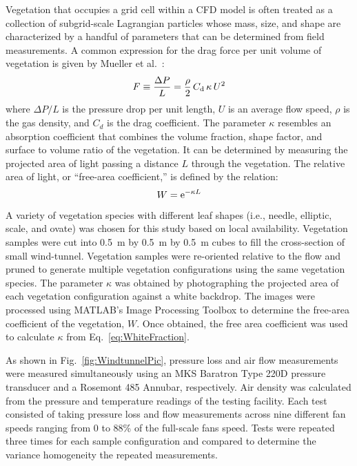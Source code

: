 \documentclass[a4paper,11pt]{article}
\begin{document}
Vegetation that occupies a grid cell within a CFD model is often treated as a collection of subgrid-scale Lagrangian particles whose mass, size, and shape are characterized by a handful of parameters that can be determined from field measurements. A common expression for the drag force per unit volume of vegetation is given by Mueller et al.~\cite{Mueller2014}:
\begin{equation}\label{eq:Pressure}
F \equiv \frac{\Delta P}{L}  = \frac{\rho}{2} \, C_{\rm d} \, \kappa \, U^2
\end{equation}
where $\Delta P/L$ is the pressure drop per unit length, $U$ is an average flow speed, $\rho$ is the gas density, and $C_{d}$ is the drag coefficient. The parameter $\kappa$ resembles an absorption coefficient that combines the volume fraction, shape factor, and surface to volume ratio of the vegetation. It can be determined by measuring the projected area of light passing a distance $L$ through the vegetation. The relative area of light, or ``free-area coefficient,'' is defined by the relation:
\begin{equation}\label{eq:WhiteFraction}
W = {\rm e}^{-\kappa L}
\end{equation}
A variety of vegetation species with different leaf shapes (i.e., needle, elliptic, scale, and ovate) was chosen for this study based on local availability. Vegetation samples were cut into 0.5~m by 0.5~m by 0.5~m cubes to fill the cross-section of small wind-tunnel. Vegetation samples were re-oriented relative to the flow and pruned to generate multiple vegetation configurations using the same vegetation species. The parameter $\kappa$ was obtained by photographing the projected area of each vegetation configuration against a white backdrop. The images were processed using MATLAB’s Image Processing Toolbox to determine the free-area coefficient of the vegetation, $W$. Once obtained, the free area coefficient was used to calculate $\kappa$ from Eq.~\ref{eq:WhiteFraction}.

As shown in Fig.~\ref{fig:WindtunnelPic}, pressure loss and air flow measurements were measured simultaneously using an MKS Baratron Type 220D pressure transducer and a Rosemont 485 Annubar, respectively. Air density was calculated from the pressure and temperature readings of the testing facility. Each test consisted of taking pressure loss and flow measurements across nine different fan speeds ranging from 0 to 88\% of the full-scale fans speed. Tests were repeated three times for each sample configuration and compared to determine the variance homogeneity the repeated measurements.
\end{document}
